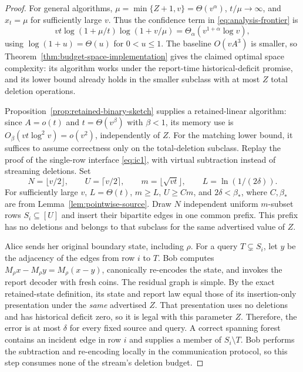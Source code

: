 \documentclass[11pt,letterpaper]{article}
\numberwithin{equation}{section}
\begin{document}
\begin{proof}
For general algorithms, $\mu=\min\{Z+1,v\}=\Theta(v^\alpha)$, $t/\mu\to\infty$, and $x_t=\mu$ for sufficiently large $v$.
Thus the confidence term in \eqref{eq:analysis-frontier} is
\[
 vt\log(1+\mu/t)\log(1+v/\mu)
 =\Theta_\alpha(v^{1+\alpha}\log v),
\]
using $\log(1+u)=\Theta(u)$ for $0<u\le1$.
The baseline $O(vA^3)$ is smaller, so Theorem~\ref{thm:budget-space-implementation} gives the claimed optimal space complexity: its algorithm works under the report-time historical-deficit promise, and its lower bound already holds in the smaller subclass with at most $Z$ total deletion operations.

Proposition~\ref{prop:retained-binary-sketch} supplies a retained-linear algorithm: since $A=o(t)$ and $t=\Theta(v^\beta)$ with $\beta<1$, its memory use is $O_\beta(vt\log^2v)=o(v^2)$, independently of $Z$.
For the matching lower bound, it suffices to assume correctness only on the total-deletion subclass.
Replay the proof of the single-row interface \eqref{eq:ic1}, with virtual subtraction instead of streaming deletions.
Set
\[
 N=\lfloor v/2\rfloor,\qquad U=\lceil v/2\rceil,\qquad
 m=\lfloor\sqrt{vt}\rfloor,\qquad L=\ln(1/(2\delta)).
\]
For sufficiently large $v$, $L=\Theta(t)$, $m\ge L$, $U\ge Cm$, and $2\delta<\beta_*$, where $C,\beta_*$ are from Lemma~\ref{lem:pointwise-source}.
Draw $N$ independent uniform $m$-subset rows $S_i\subseteq[U]$ and insert their bipartite edges in one common prefix.
This prefix has no deletions and belongs to that subclass for the same advertised value of $Z$.

Alice sends her original boundary state, including $\rho$.
For a query $T\subsetneq S_i$, let $y$ be the adjacency of the edges from row $i$ to $T$.
Bob computes $M_\rho x-M_\rho y=M_\rho(x-y)$, canonically re-encodes the state, and invokes the report decoder with fresh coins.
The residual graph is simple.
By the exact retained-state definition, its state and report law equal those of its insertion-only presentation under the \emph{same} advertised $Z$.
That presentation uses no deletions and has historical deficit zero, so it is legal with this parameter $Z$.
Therefore, the error is at most $\delta$ for every fixed source and query.
A correct spanning forest contains an incident edge in row $i$ and supplies a member of $S_i\setminus T$.
Bob performs the subtraction and re-encoding locally in the communication protocol, so this step consumes none of the stream's deletion budget.


\end{proof}
\end{document}
